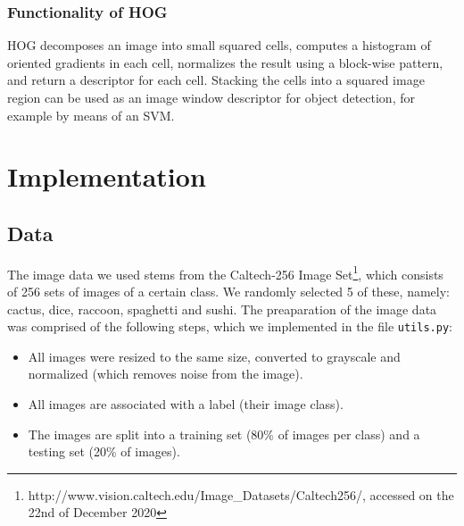 \documentclass{scrartcl}
\begin{document}
\subsubsection{Functionality of HOG}

HOG decomposes an image into small squared cells, computes a histogram of oriented gradients in each cell, normalizes the result using a block-wise pattern, and return a descriptor for each cell. Stacking the cells into a squared image region can be used as an image window descriptor for object detection, for example by means of an SVM.

\section{Implementation}
\subsection{Data}
The image data we used stems from the Caltech-256 Image Set\footnote{http://www.vision.caltech.edu/Image\_Datasets/Caltech256/, accessed on the 22nd of December 2020}, which consists of 256 sets of images of a certain class. We randomly selected 5 of these, namely: cactus, dice, raccoon, spaghetti and sushi. The preaparation of the image data was comprised of the following steps, which we implemented in the file \texttt{utils.py}:
\begin{itemize}
  \item All images were resized to the same size, converted to grayscale and normalized (which removes noise from the image).
  \item All images are associated with a label (their image class).
  \item The images are split into a training set (80\% of images per class) and a testing set (20\% of images).
\end{itemize}
\end{document}
